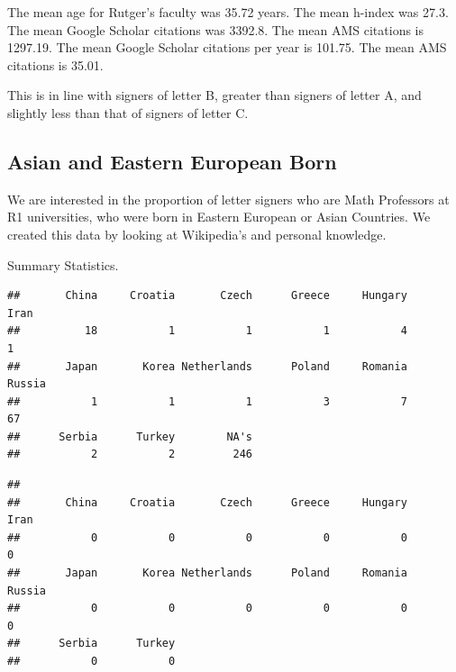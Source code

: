 \documentclass[]{article}
\newenvironment{Shaded}{\begin{snugshade}}{\end{snugshade}}
\newcommand{\KeywordTok}[1]{\textcolor[rgb]{0.13,0.29,0.53}{\textbf{#1}}}
\newcommand{\NormalTok}[1]{#1}
\newcommand{\OperatorTok}[1]{\textcolor[rgb]{0.81,0.36,0.00}{\textbf{#1}}}
\newcommand{\StringTok}[1]{\textcolor[rgb]{0.31,0.60,0.02}{#1}}
\begin{document}
The mean age for Rutger's faculty was 35.72 years. The mean h-index was
27.3. The mean Google Scholar citations was 3392.8. The mean AMS
citations is 1297.19. The mean Google Scholar citations per year is
101.75. The mean AMS citations is 35.01.

This is in line with signers of letter B, greater than signers of letter
A, and slightly less than that of signers of letter C.

\hypertarget{asian-and-eastern-european-born}{%
\subsection{Asian and Eastern European
Born}\label{asian-and-eastern-european-born}}

We are interested in the proportion of letter signers who are Math
Professors at R1 universities, who were born in Eastern European or
Asian Countries. We created this data by looking at Wikipedia's and
personal knowledge.

Summary Statistics.

\begin{verbatim}
##       China     Croatia       Czech      Greece     Hungary        Iran 
##          18           1           1           1           4           1 
##       Japan       Korea Netherlands      Poland     Romania      Russia 
##           1           1           1           3           7          67 
##      Serbia      Turkey        NA's 
##           2           2         246
\end{verbatim}

\begin{Shaded}
\end{Shaded}

\begin{verbatim}
## 
##       China     Croatia       Czech      Greece     Hungary        Iran 
##           0           0           0           0           0           0 
##       Japan       Korea Netherlands      Poland     Romania      Russia 
##           0           0           0           0           0           0 
##      Serbia      Turkey 
##           0           0
\end{verbatim}
\end{document}
